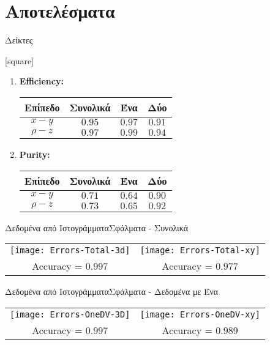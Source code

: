 \section{Αποτελέσματα}

\begin{frame}{Δείκτες}
	
	[square]

	\begin{enumerate}
		\item \textbf{Efficiency:} 
			\\[2mm]
			\begin{tabular}{c c c c} \toprule
				Επίπεδο & Συνολικά & Ένα \dvtrue & Δύο \dvtrue \\ \midrule
				$x-y$ & $0.95$ & $0.97$ & $0.91$ \\ 
				$\rho-z$ & $0.97$ & $0.99$ & $0.94$ \\ \bottomrule
			\end{tabular}
			\vspace{4mm}
		\item \textbf{Purity:} 
			\\[2mm]
			\begin{tabular}{c c c c} \toprule
				Επίπεδο & Συνολικά & Ένα \dvtrue & Δύο \dvtrue \\ \midrule
				$x-y$ & $0.71$ & $0.64$ & $0.90$ \\ 
				$\rho-z$ & $0.73$ & $0.65$ & $0.92$ \\ \bottomrule
			\end{tabular}	
	\end{enumerate}
\end{frame}

\beamerdefaultoverlayspecification{}

\begin{frame}{Δεδομένα από Ιστογράμματα}{Σφάλματα - Συνολικά}
	\centering
	\begin{tabular}{c c}
		\texttt{[image: Errors-Total-3d]} & 
		\texttt{[image: Errors-Total-xy]} \\[4mm]
		\small{Accuracy = $0.997$} & \small{Accuracy = $0.977$}
	\end{tabular}
\end{frame}

\begin{frame}{Δεδομένα από Ιστογράμματα}{Σφάλματα - Δεδομένα με Ένα \dvtrue}
	\centering
	\begin{tabular}{c c}
		\texttt{[image: Errors-OneDV-3D]} & 
		\texttt{[image: Errors-OneDV-xy]} \\[4mm]
		\small{Accuracy = $0.997$} & \small{Accuracy = $0.989$}
	\end{tabular}
\end{frame}

